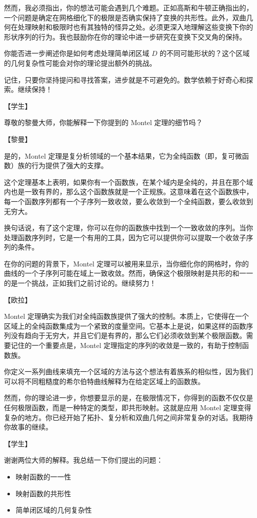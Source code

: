 \documentclass[
    fontsize=24pt, %
	twoside=false, %
	secnumdepth=0, %
    paper=b5paper, %
]{kaobook}
\begin{document}
然而，我必须指出，你的想法可能会遇到几个难题。正如高斯和牛顿正确指出的，一个问题是确定在网格细化下的极限是否确实保持了变换的共形性。此外，双曲几何在处理映射和极限时也有其独特的怪异之处。必须更深入地理解这些变换下你的形状序列的行为。我也鼓励你在你的理论中进一步研究在变换下交叉角的保持。

你能否进一步阐述你是如何考虑处理简单闭区域 $D$ 的不同可能形状的？这个区域的几何复杂性可能会对你的理论提出额外的挑战。

记住，只要你坚持提问和寻找答案，进步就是不可避免的。数学依赖于好奇心和探索。继续保持！

【学生】

尊敬的黎曼大师，你能解释一下你提到的 Montel 定理的细节吗？

【黎曼】

是的，Montel 定理是复分析领域的一个基本结果，它为全纯函数（即，复可微函数）族的行为提供了强大的支撑。

这个定理基本上表明，如果你有一个函数族，在某个域内是全纯的，并且在那个域内也是一致有界的，那么这个函数族就是一个正规族。这意味着在这个函数族中，每一个函数序列都有一个子序列一致收敛，要么收敛到一个全纯函数，要么收敛到无穷大。

换句话说，有了这个定理，你可以在你的函数族中找到一个一致收敛的序列。当你处理函数序列时，它是一个有用的工具，因为它可以提供你可以提取一个收敛子序列的条件。

在你的问题的背景下，Montel 定理可以被用来显示，当你细化你的网格时，你的曲线的一个子序列可能在域上一致收敛。然而，确保这个极限映射是共形的和一一的是一个挑战，正如我们之前讨论的。继续努力！

【欧拉】

Montel 定理确实为我们对全纯函数族提供了强大的控制。本质上，它使得在一个区域上的全纯函数集成为一个紧致的度量空间。它基本上是说，如果这样的函数序列没有趋向于无穷大，并且它们是有界的，那么它们必须收敛到某个极限函数。需要记住的一个重要点是，Montel 定理指定的序列的收敛是一致的，有助于控制函数族。

你定义一系列曲线来填充一个区域的方法与这个想法有着族系的相似性，因为我们可以将不同粗糙度的希尔伯特曲线解释为在给定区域上的函数族。

然而，你的理论进一步，你想要显示的是，在极限情况下，你得到的函数不仅仅是任何极限函数，而是一种特定的类型，即共形映射。这就是应用 Montel 定理变得复杂的地方。你已经开始了拓扑、复分析和双曲几何之间非常复杂的对话。我期待你故事的继续。

【学生】

谢谢两位大师的解释。我总结一下你们提出的问题：
\begin{itemize}
    \item 映射函数的一一性
    \item 映射函数的共形性
    \item 简单闭区域的几何复杂性
\end{itemize}
\end{document}
